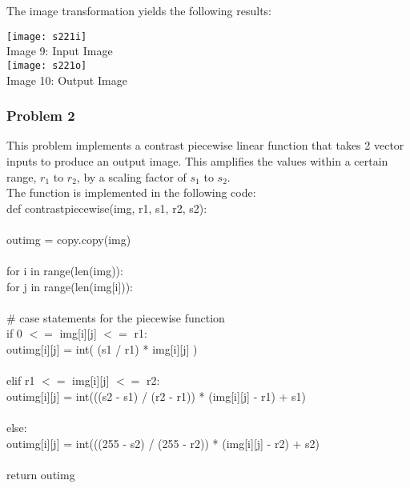 \documentclass{article}
\begin{document}
	The image transformation yields the following results: \\
	
	\begin{center}
		\noindent \texttt{[image: s221i]}\\
		Image 9: Input Image\\
		\texttt{[image: s221o]}\\
		Image 10: Output Image\\
	\end{center}
	
	\subsubsection{Problem 2}
	
	This problem implements a contrast piecewise linear function that takes 2 vector inputs to produce an output image. This amplifies the values within a certain range, $ r_{1} $ to $ r_{2}$, by a scaling factor of $ s_{1}$ to $ s_{2} $.\\
	
	The function is implemented in the following code:\\
	
	\noindent def contrast\textunderscore piecewise(img, r1, s1, r2, s2): \\
	\\
	\indent out\textunderscore img = copy.copy(img)\\
	\\
	\indent for i in range(len(img)):\\
	\indent \indent for j in range(len(img[i])):\\
	\\
	\indent \indent \indent \# case statements for the piecewise function\\
	\indent \indent \indent if 0 $ <= $ img[i][j] $ <= $ r1:\\
	\indent \indent \indent \indent out\textunderscore img[i][j] = int( (s1 / r1) * img[i][j] )\\
	\\
	\indent \indent \indent elif r1 $ <= $ img[i][j] $ <= $ r2:\\
	\indent \indent \indent \indent out\textunderscore img[i][j] = int(((s2 - s1) / (r2 - r1)) * (img[i][j] - r1) + s1)\\
	\\
	\indent \indent \indent else:\\
	\indent \indent \indent \indent out\textunderscore img[i][j] = int(((255 - s2) / (255 - r2)) * (img[i][j] - r2) + s2)\\
	\\
	\indent return out\textunderscore img\\
	
\end{document}
